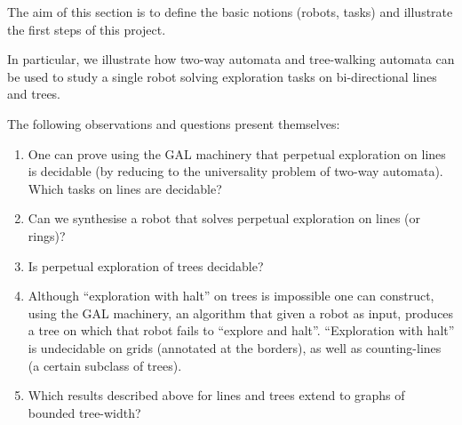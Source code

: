  The aim of this section is to define the basic notions (robots, tasks) and
illustrate the first steps of this project.

In particular, we illustrate %
how two-way automata and tree-walking automata can be used to study a single
robot solving exploration tasks on bi-directional lines and trees.
%
%






The following observations and questions present themselves:
\begin{enumerate}
\item One can prove using the GAL machinery that perpetual exploration on lines
is decidable (by reducing to the universality problem of two-way automata).
Which tasks on lines are decidable?
\item Can we synthesise a robot that solves perpetual exploration on lines (or
rings)?
\item Is perpetual exploration of trees decidable?
\item Although ``exploration with halt'' on trees is impossible
\cite{Diks200438} one can construct, using the GAL machinery, an algorithm that
given a robot as input, produces a tree on which that robot fails to ``explore
and halt''. ``Exploration with halt'' is undecidable on grids (annotated at the
borders), as well as counting-lines (a certain subclass of trees).
\item Which results described above for lines and trees extend to graphs of
bounded tree-width?
\end{enumerate}


